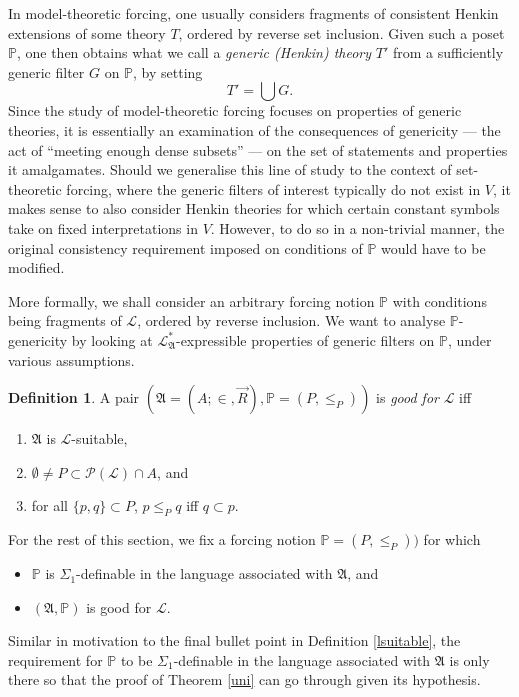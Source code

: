 \documentclass[12pt, twoside]{memoir}
\numberwithin{equation}{section}
\theoremstyle{definition}
\newtheorem{defi}[thm]{Definition}
\theoremstyle{remark}
\theoremstyle{definition}
\theoremstyle{definition}
\theoremstyle{definition}
\theoremstyle{remark}
\begin{document}
In model-theoretic forcing, one usually considers fragments of consistent Henkin extensions of some theory $T$, ordered by reverse set inclusion. Given such a poset $\mathbb{P}$, one then obtains what we call a \textit{generic (Henkin) theory} $T'$ from a sufficiently generic filter $G$ on $\mathbb{P}$, by setting $$T' = \bigcup G \text{.}$$ Since the study of model-theoretic forcing focuses on properties of generic theories, it is essentially an examination of the consequences of genericity --- the act of ``meeting enough dense subsets'' --- on the set of statements and properties it amalgamates. Should we generalise this line of study to the context of set-theoretic forcing, where the generic filters of interest typically do not exist in $V$, it makes sense to also consider Henkin theories for which certain constant symbols take on fixed interpretations in $V$. However, to do so in a non-trivial manner, the original consistency requirement imposed on conditions of $\mathbb{P}$ would have to be modified.

More formally, we shall consider an arbitrary forcing notion $\mathbb{P}$ with conditions being fragments of $\mathcal{L}$, ordered by reverse inclusion. We want to analyse $\mathbb{P}$-genericity by looking at $\mathcal{L}^{*}_{\mathfrak{A}}$-expressible properties of generic filters on $\mathbb{P}$, under various assumptions.

\begin{defi}
A pair $(\mathfrak{A} = (A; \in, \Vec{R}), \mathbb{P} = (P, \leq_P))$ is \emph{good for} $\mathcal{L}$ iff 
\begin{enumerate}[label=(\alph*)]
    \item $\mathfrak{A}$ is $\mathcal{L}$-suitable,
    \item $\emptyset \neq P \subset \mathcal{P}(\mathcal{L}) \cap A$, and
    \item for all $\{p, q\} \subset P$, $p \leq_P q$ iff $q \subset p$.
\end{enumerate}
\end{defi}

For the rest of this section, we fix a forcing notion $\mathbb{P} = (P, \leq_P))$ for which
\begin{itemize}
    \item $\mathbb{P}$ is $\Sigma_1$-definable in the language associated with $\mathfrak{A}$, and
    \item $(\mathfrak{A}, \mathbb{P})$ is good for $\mathcal{L}$.
\end{itemize}
Similar in motivation to the final bullet point in Definition \ref{lsuitable}, the requirement for $\mathbb{P}$ to be $\Sigma_1$-definable in the language associated with $\mathfrak{A}$ is only there so that the proof of Theorem \ref{uni} can go through given its hypothesis.
\end{document}
